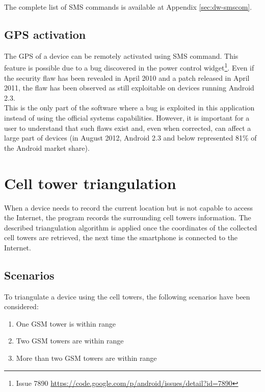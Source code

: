The complete list of SMS commands is available at Appendix \ref{sec:dw-smscom}.

\subsection{GPS activation}
\label{sec:dw-gps-bug}

The GPS of a device can be remotely activated using SMS command.
This feature is possible due to a bug discovered in the power control widget\footnote{Issue 7890 \url{https://code.google.com/p/android/issues/detail?id=7890}}.
Even if the security flaw has been revealed in April 2010 and a patch released in April 2011, the flaw has been observed as still exploitable on devices running Android 2.3.\\

This is the only part of the software where a bug is exploited in this application instead of using the official systems capabilities.
However, it is important for a user to understand that such flaws exist and, even when corrected, can affect a large part of devices (in August 2012, Android 2.3 and below represented 81\% of the Android market share).


\section{Cell tower triangulation}

\label{sec:dw-cell-triangu}



When a device needs to record the current location but is not capable to access the Internet, the program records the surrounding cell towers information.
The described triangulation algorithm is applied once the coordinates of the collected cell towers are retrieved, the next time the smartphone is connected to the Internet.

\subsection{Scenarios}

To triangulate a device using the cell towers, the following scenarios have been considered:

\begin{enumerate}
\item One GSM tower is within range
\item Two GSM towers are within range
\item More than two GSM towers are within range
\end{enumerate}

